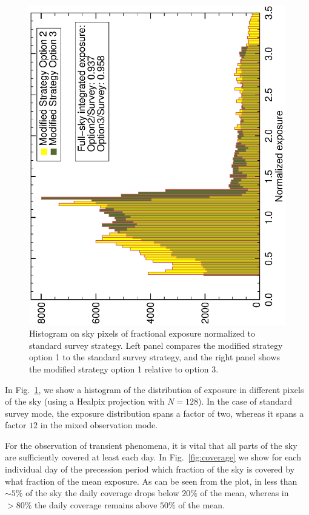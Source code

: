 \documentclass[aps,prd,superscriptaddress,showpacs,nofootinbib,fixlfloat, 12pt]{revtex4-1}
\begin{document}
\begin{figure}[t]
  \begin{center}
    \includegraphics[width=0.49\linewidth, angle=-90]{plots/option2_option3_hist.ps}
    \vspace{-0.5cm}
  \end{center}
  \caption{Histogram on sky pixels of fractional exposure normalized to
  standard survey strategy. Left panel compares the modified strategy option 1
  to the standard survey strategy, and the right panel shows the modified
  strategy option 1 relative to option 3. }
  \label{fig:expHisto}
\end{figure}

In Fig.~\ref{fig:expHisto}, we show a histogram of the distribution of exposure
in different pixels of the sky (using a Healpix projection with $N=128$). In
the 
case of standard survey mode, the exposure distribution spans a factor of two,
whereas it spans a factor $12$ in the mixed observation mode. 

For the observation of transient phenomena, it is vital that all parts of the
sky are sufficiently covered at least each day. In Fig.~\ref{fig:coverage} we
show for each individual day of the precession period which fraction of the
sky is covered by what fraction of the mean exposure. As can be seen from the
plot, in less than $\sim5\%$ of the sky the daily coverage drops below $20\%$
of the mean, whereas in $>80\%$ the daily coverage remains above $50\%$ of the
mean.
\end{document}
